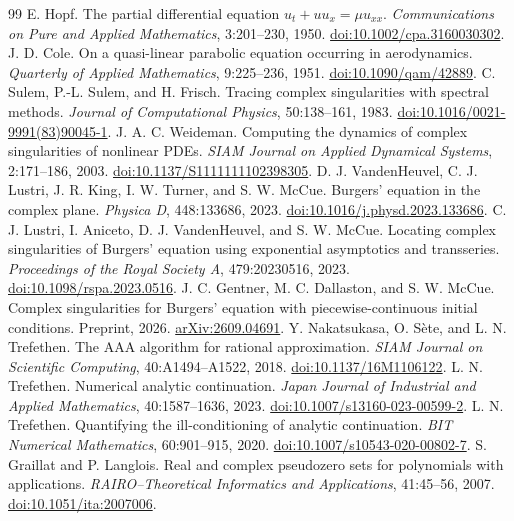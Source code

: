 \documentclass[11pt]{article}
\begin{document}
\begin{thebibliography}{99}\small
{} E. Hopf. The partial differential equation $u_t+uu_x=\mu u_{xx}$. \emph{Communications on Pure and Applied Mathematics}, 3:201--230, 1950. \href{https://doi.org/10.1002/cpa.3160030302}{doi:10.1002/cpa.3160030302}.
 J. D. Cole. On a quasi-linear parabolic equation occurring in aerodynamics. \emph{Quarterly of Applied Mathematics}, 9:225--236, 1951. \href{https://doi.org/10.1090/qam/42889}{doi:10.1090/qam/42889}.
 C. Sulem, P.-L. Sulem, and H. Frisch. Tracing complex singularities with spectral methods. \emph{Journal of Computational Physics}, 50:138--161, 1983. \href{https://doi.org/10.1016/0021-9991(83)90045-1}{doi:10.1016/0021-9991(83)90045-1}.
 J. A. C. Weideman. Computing the dynamics of complex singularities of nonlinear PDEs. \emph{SIAM Journal on Applied Dynamical Systems}, 2:171--186, 2003. \href{https://doi.org/10.1137/S1111111102398305}{doi:10.1137/S1111111102398305}.
 D. J. VandenHeuvel, C. J. Lustri, J. R. King, I. W. Turner, and S. W. McCue. Burgers' equation in the complex plane. \emph{Physica D}, 448:133686, 2023. \href{https://doi.org/10.1016/j.physd.2023.133686}{doi:10.1016/j.physd.2023.133686}.
 C. J. Lustri, I. Aniceto, D. J. VandenHeuvel, and S. W. McCue. Locating complex singularities of Burgers' equation using exponential asymptotics and transseries. \emph{Proceedings of the Royal Society A}, 479:20230516, 2023. \href{https://doi.org/10.1098/rspa.2023.0516}{doi:10.1098/rspa.2023.0516}.
 J. C. Gentner, M. C. Dallaston, and S. W. McCue. Complex singularities for Burgers' equation with piecewise-continuous initial conditions. Preprint, 2026. \href{https://arxiv.org/abs/2609.04691}{arXiv:2609.04691}.
 Y. Nakatsukasa, O. S\`ete, and L. N. Trefethen. The AAA algorithm for rational approximation. \emph{SIAM Journal on Scientific Computing}, 40:A1494--A1522, 2018. \href{https://doi.org/10.1137/16M1106122}{doi:10.1137/16M1106122}.
 L. N. Trefethen. Numerical analytic continuation. \emph{Japan Journal of Industrial and Applied Mathematics}, 40:1587--1636, 2023. \href{https://doi.org/10.1007/s13160-023-00599-2}{doi:10.1007/s13160-023-00599-2}.
 L. N. Trefethen. Quantifying the ill-conditioning of analytic continuation. \emph{BIT Numerical Mathematics}, 60:901--915, 2020. \href{https://doi.org/10.1007/s10543-020-00802-7}{doi:10.1007/s10543-020-00802-7}.
 S. Graillat and P. Langlois. Real and complex pseudozero sets for polynomials with applications. \emph{RAIRO--Theoretical Informatics and Applications}, 41:45--56, 2007. \href{https://doi.org/10.1051/ita:2007006}{doi:10.1051/ita:2007006}.

\end{thebibliography}
\end{document}
